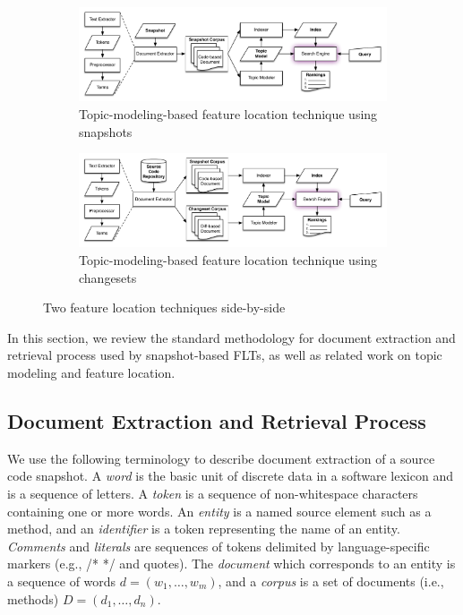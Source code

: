 
\begin{figure}[t]
    \centering
\begin{subfigure}[t]{.9\textwidth}
    \centerline{\includegraphics[width=\textwidth]{figures/snapshot-flt}}
    \caption{Topic-modeling-based feature location technique using snapshots}
    \label{fig:snapshot}
\end{subfigure}

\begin{subfigure}[b]{.9\textwidth}
    \centerline{\includegraphics[width=\textwidth]{figures/changeset-flt}}
\caption{Topic-modeling-based feature location technique using changesets}
\label{fig:changeset}
\end{subfigure}

\label{fig:flts}
\caption{Two feature location techniques side-by-side}
\end{figure}


In this section, we review the standard methodology for document extraction and
retrieval process used by snapshot-based FLTs, as well as related work on topic
modeling and feature location.

\subsection{Document Extraction and Retrieval Process}
\label{sec:snapshot-flt}

We use the following terminology to describe document extraction of a source code snapshot.
A \textit{word} is the basic unit of discrete data in a software lexicon and is a sequence of letters.
A \textit{token} is a sequence of non-whitespace characters containing one or more words.
An \textit{entity} is a named source element such as a method,
and an \textit{identifier} is a token representing the name of an entity.
\textit{Comments} and \textit{literals} are sequences of tokens delimited by language-specific markers (e.g., /* */ and quotes).
The \textit{document} which corresponds to an entity is a sequence of words $d = (w_1, \ldots, w_m)$,
and a \textit{corpus} is a set of documents (i.e., methods) $D = (d_1, \ldots, d_n)$.

